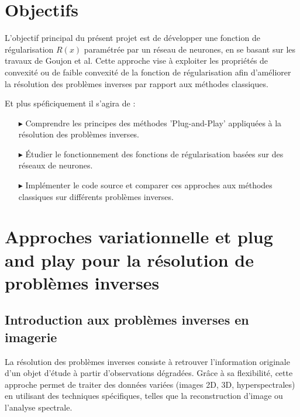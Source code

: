 \documentclass[a4paper, 12pt]{report} %
\begin{document}
\tableofcontents 

\newpage


\chapter*{Objectifs }
L'objectif principal du présent projet est de développer une fonction de régularisation \( R(x) \) paramétrée par un réseau de neurones, en se basant sur les travaux de Goujon et al. Cette approche vise à exploiter les propriétés de convexité ou de faible convexité de la fonction de régularisation afin d'améliorer la résolution des problèmes inverses par rapport aux méthodes classiques.

Et plus spéficiquement il s'agira de :
\begin{itemize}
    \item [$\blacktriangleright$] Comprendre les principes des méthodes 'Plug-and-Play' appliquées à la résolution des problèmes inverses.
    \item [$\blacktriangleright$] Étudier le fonctionnement des fonctions de régularisation basées sur des réseaux de neurones.
    \item [$\blacktriangleright$] Implémenter le code source et comparer ces approches aux méthodes classiques sur différents problèmes inverses.
\end{itemize} 

\newpage


\chapter{Approches variationnelle et plug and play pour la résolution de problèmes inverses}


\section{Introduction aux  problèmes inverses en imagerie}
 
La résolution des problèmes inverses consiste à retrouver l'information originale d'un objet d'étude à partir d'observations dégradées. Grâce à sa flexibilité, cette approche permet de traiter des données variées (images 2D, 3D, hyperspectrales) en utilisant des techniques spécifiques, telles que la reconstruction d'image ou l'analyse spectrale.
\end{document}
